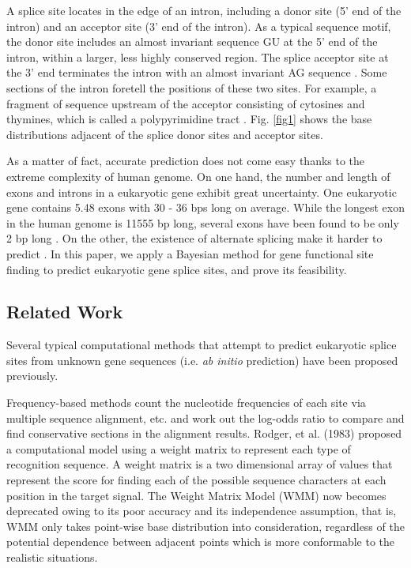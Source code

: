 \documentclass[journal,twoside]{IEEEtran}
\begin{document}
A splice site locates in the edge of an intron, including a donor site (5' end of the intron) and an acceptor site (3' end of the intron). As a typical sequence motif, the donor site includes an almost invariant sequence GU at the 5' end of the intron, within a larger, less highly conserved region. The splice acceptor site at the 3' end terminates the intron with an almost invariant AG sequence \cite{black2003mechanisms}.  Some sections of the intron foretell the positions of these two sites. For example, a fragment of sequence upstream of the acceptor consisting of cytosines and thymines, which is called a polypyrimidine tract \cite{lodish2008molecular}. Fig. \ref{fig1} shows the base distributions adjacent of the splice donor sites and acceptor sites. 

As a matter of fact, accurate prediction does not come easy thanks to the extreme complexity of human genome. On one hand, the number and length of exons and introns in a eukaryotic gene exhibit great uncertainty. One eukaryotic gene contains 5.48 exons with 30 - 36 bps long on average. While the longest exon in the human genome is 11555 bp long, several exons have been found to be only 2 bp long \cite{sakharkar2004distributions}. On the other, the existence of alternate splicing make it harder to predict \cite{black2003mechanisms}. In this paper, we apply a Bayesian method for gene functional site finding to predict eukaryotic gene splice sites, and prove its feasibility. 

\subsection{Related Work}\label{1.1}

Several typical computational methods that attempt to predict eukaryotic splice sites from unknown gene sequences (i.e. \textsl{ab initio} prediction) have been proposed previously. 

Frequency-based methods count the nucleotide frequencies of each site via multiple sequence alignment, etc. and work out the log-odds ratio to compare and find conservative sections in the alignment results. Rodger, et al. (1983) \cite{staden1984computer} proposed a computational model using a weight matrix to represent each type of recognition sequence. A weight matrix is a two dimensional array of values that represent the score for finding each of the possible sequence characters at each position in the target signal. The Weight Matrix Model (WMM) now becomes deprecated owing to its poor accuracy and its independence assumption, that is, WMM only takes point-wise base distribution into consideration, regardless of the potential dependence between adjacent points which is more conformable to the realistic situations. 
\end{document}

